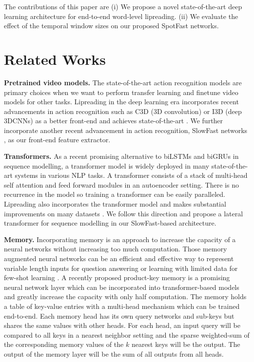 \documentclass{article}
\begin{document}
The contributions of this paper are (i) We propose a novel state-of-the-art deep learning architecture for end-to-end word-level lipreading. (ii) We evaluate the effect of the temporal window sizes on our proposed SpotFast networks.  \section{Related Works}
\textbf{Pretrained video models.} The state-of-the-art action recognition models are primary choices when we want to perform transfer learning and finetune video models for other tasks. Lipreading in the deep learning era incorporates recent advancements in action recognition such as C3D (3D convolution) \cite{tran2015learning} or I3D (deep 3DCNNs) \cite{carreira2017quo} as a better front-end and achieves state-of-the-art \cite{stafylakis2017combining, weng2019learning}. We further incorporate another recent advancement in action recognition, SlowFast networks \cite{feichtenhofer2019slowfast}, as our front-end feature extractor. 

\hspace{-1.2\baselineskip}\textbf{Transformers.} As a recent promising alternative to biLSTMs and biGRUs in sequence modelling, a transformer model \cite{vaswani2017attention} is widely deployed in many state-of-the-art systems in various NLP tasks. A transformer consists of a stack of multi-head self attention and feed forward modules in an autoencoder setting. There is no recurrence in the model so training a transformer can be easily paralleled. Lipreading also incorporates the transformer model and makes substantial improvements on many datasets \cite{afouras2018deep, Zhang_2019_ICCV}. We follow this direction and propose a lateral transformer for sequence modelling in our SlowFast-based architecture.

\hspace{-1.2\baselineskip}\textbf{Memory.} Incorporating memory is an approach to increase the capacity of a neural networks without increasing too much computation. Those memory augmented neural networks can be an efficient and effective way to represent variable length inputs for question answering \cite{weston2014memory, sukhbaatar2015end} or learning with limited data for few-shot learning \cite{santoro2016meta, zhu2018compound}. 
A recently proposed product-key memory \cite{lample2019large} is a promising neural network layer which can be incorporated into transformer-based models and greatly increase the capacity with only half computation. The memory holds a table of key-value entries with a multi-head mechanism which can be trained end-to-end. Each memory head has its own query networks and sub-keys but shares the same values with other heads. For each head, an input query will be compared to all keys in a nearest neighbor setting and the sparse weighted-sum of the corresponding memory values of the $k$ nearest keys will be the output. The output of the memory layer will be the sum of all outputs from all heads.
\end{document}
